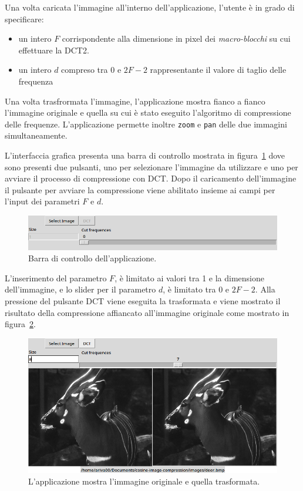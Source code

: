 \documentclass[a4paper, 12pt]{article}
\begin{document}
Una volta caricata l'immagine all'interno dell'applicazione, l'utente è in grado
di specificare:

\begin{itemize}
  \item un intero $F$ corrispondente alla dimensione in pixel dei
        \textit{macro-blocchi} su cui effettuare la DCT2.
  \item un intero $d$ compreso tra $0$ e $2F - 2$ rappresentante il valore di
        taglio delle frequenza
\end{itemize}

Una volta trasfrormata l'immagine, l'applicazione mostra fianco a fianco
l'immagine originale e quella su cui è stato eseguito l'algoritmo di
compressione delle frequenze. L'applicazione permette inoltre \texttt{zoom} e
\texttt{pan} delle due immagini simultaneamente.

L'interfaccia grafica presenta una barra di controllo mostrata in 
figura~\ref{fig:control-bar} dove sono presenti due pulsanti, uno per 
selezionare l'immagine da utilizzare e uno per avviare il processo di 
compressione con DCT. Dopo il caricamento dell'immagine il pulsante per avviare 
la compressione viene abilitato insieme ai campi per l'input dei parametri 
$F$ e $d$.

\begin{figure}[h]
  \includegraphics[width=\textwidth]{./imgs/control-bar.png}
  \caption{Barra di controllo dell'applicazione.}
  \label{fig:control-bar}
\end{figure}

L'inserimento del parametro $F$, è limitato ai valori tra 1 e la dimensione 
dell'immagine, e lo slider per il parametro $d$, è limitato tra $0$ e $2F-2$.
Alla pressione del pulsante DCT viene eseguita la trasformata e viene mostrato
il risultato della compressione affiancato all'immagine originale come mostrato
in figura~\ref{fig:after-transform}.

\begin{figure}[h]
  \includegraphics[width=\textwidth]{./imgs/after-transform.png}
  \caption{L'applicazione mostra l'immagine originale e quella trasformata.}
  \label{fig:after-transform}
\end{figure}
\end{document}
